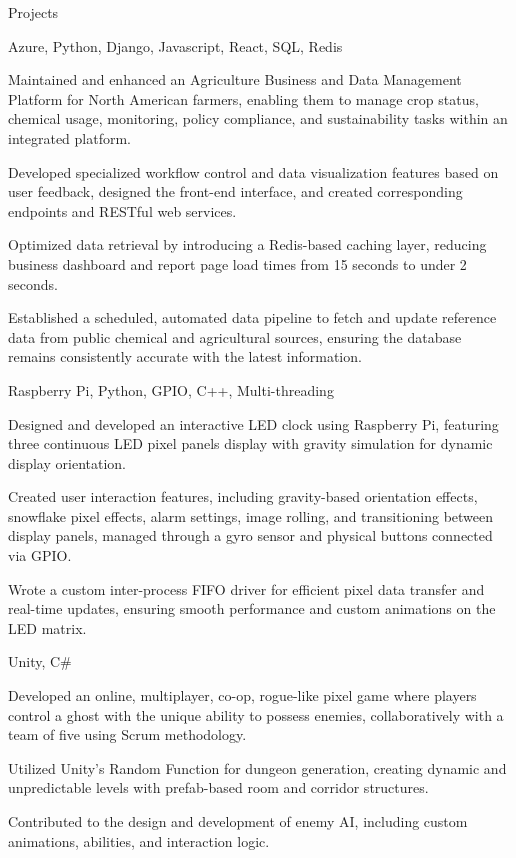 \documentclass[a4paper,10pt]{extarticle}
\begin{document}
\begin{customsection}{Projects}

    {Azure, Python, Django, Javascript, React, SQL, Redis}
    {
        \item Maintained and enhanced an Agriculture Business and Data Management Platform for North American farmers, enabling them to manage crop status, chemical usage, monitoring, policy compliance, and sustainability tasks within an integrated platform.
        \item Developed specialized workflow control and data visualization features based on user feedback, designed the front-end interface, and created corresponding endpoints and RESTful web services.
        \item Optimized data retrieval by introducing a Redis-based caching layer, reducing business dashboard and report page load times from 15 seconds to under 2 seconds.
        \item Established a scheduled, automated data pipeline to fetch and update reference data from public chemical and agricultural sources, ensuring the database remains consistently accurate with the latest information.
    }

    {Raspberry Pi, Python, GPIO, C++, Multi-threading}
    {
        \item Designed and developed an interactive LED clock using Raspberry Pi, featuring three continuous LED pixel panels display with gravity simulation for dynamic display orientation.
        \item Created user interaction features, including gravity-based orientation effects, snowflake pixel effects, alarm settings, image rolling, and transitioning between display panels, managed through a gyro sensor and physical buttons connected via GPIO.
        \item Wrote a custom inter-process FIFO driver for efficient pixel data transfer and real-time updates, ensuring smooth performance and custom animations on the LED matrix.
    }

    {Unity, C\#}
    {
        \item Developed an online, multiplayer, co-op, rogue-like pixel game where players control a ghost with the unique ability to possess enemies, collaboratively with a team of five using Scrum methodology.
        \item Utilized Unity's Random Function for dungeon generation, creating dynamic and unpredictable levels with prefab-based room and corridor structures.
        \item Contributed to the design and development of enemy AI, including custom animations, abilities, and interaction logic.
    }

\end{customsection}
\end{document}
